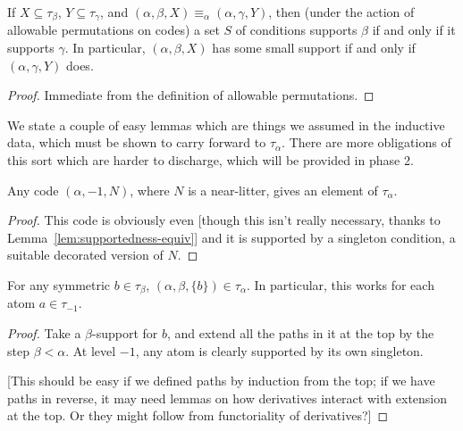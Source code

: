 \begin{lemma}
\label{lem:supportedness-equiv}
If $X \subseteq \tau_\beta$, $Y \subseteq \tau_\gamma$, and $(\alpha,\beta,X) \equiv_\alpha (\alpha,\gamma,Y)$, then (under the action of allowable permutations on codes) a set $S$ of conditions supports $\beta$ if and only if it supports $\gamma$.  In particular,  $(\alpha,\beta,X)$ has some small support if and only if $(\alpha,\gamma,Y)$ does.
\end{lemma}

\begin{proof}
  Immediate from the definition of allowable permutations.
\end{proof}

We state a couple of easy lemmas which are things we assumed in the inductive data, which must be shown to carry forward to $\tau_\alpha$.  There are more obligations of this sort which are harder to discharge, which will be provided in phase 2.

\begin{lemma}
\label{def:typed-near-litter}
\leanok
Any code $(\alpha,-1,N)$, where $N$ is a near-litter, gives an element of $\tau_\alpha$.
\end{lemma}

\begin{proof}
This code is obviously even [though this isn’t really necessary, thanks to Lemma~\ref{lem:supportedness-equiv}] and it is supported by a singleton condition, a suitable decorated version of $N$.
\end{proof}

\begin{lemma}
\label{def:typed-singleton}
\leanok
For any symmetric $b \in \tau_\beta$, $(\alpha,\beta,\{b\}) \in \tau_\alpha$. In particular, this works for each atom $a \in \tau_{-1}$.
\end{lemma}

\begin{proof}
Take a $\beta$-support for $b$, and extend all the paths in it at the top by the step $\beta < \alpha$.  At level $-1$, any atom is clearly supported by its own singleton.

[This should be easy if we defined paths by induction from the top; if we have paths in reverse, it may need lemmas on how derivatives interact with extension at the top.  Or they might follow from functoriality of derivatives?]
\end{proof}

